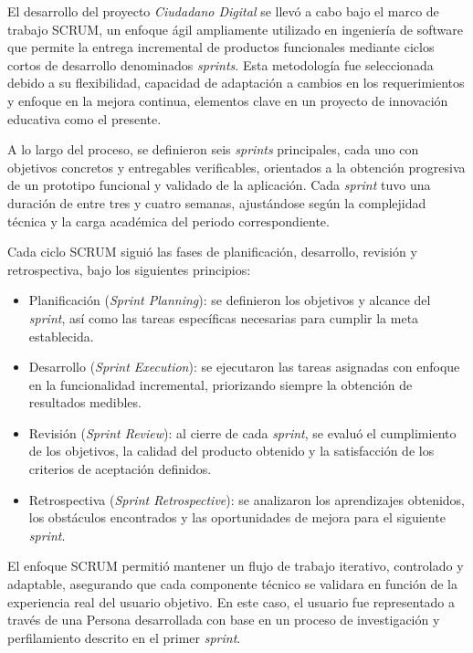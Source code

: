 El desarrollo del proyecto \textit{Ciudadano Digital} se llevó a cabo bajo el marco de
trabajo SCRUM, un enfoque ágil ampliamente utilizado en ingeniería de software
que permite la entrega incremental de productos funcionales mediante ciclos
cortos de desarrollo denominados \textit{sprints}. Esta metodología fue
seleccionada debido a su flexibilidad, capacidad de adaptación a cambios en los
requerimientos y enfoque en la mejora continua, elementos clave en un proyecto
de innovación educativa como el presente.

A lo largo del proceso, se definieron seis \textit{sprints} principales, cada
uno con objetivos concretos y entregables verificables, orientados a la
obtención progresiva de un prototipo funcional y validado de la aplicación.
Cada \textit{sprint} tuvo una duración de entre tres y cuatro semanas,
ajustándose según la complejidad técnica y la carga académica del periodo
correspondiente.

Cada ciclo SCRUM siguió las fases de planificación, desarrollo, revisión y
retrospectiva, bajo los siguientes principios:

\begin{itemize}
      \item Planificación (\textit{Sprint Planning}): se definieron los objetivos y alcance
            del \textit{sprint}, así como las tareas específicas necesarias para cumplir la
            meta establecida.
      \item Desarrollo (\textit{Sprint Execution}): se ejecutaron las tareas asignadas con
            enfoque en la funcionalidad incremental, priorizando siempre la obtención de
            resultados medibles.
      \item Revisión (\textit{Sprint Review}): al cierre de cada \textit{sprint}, se evaluó
            el cumplimiento de los objetivos, la calidad del producto obtenido y la
            satisfacción de los criterios de aceptación definidos.
      \item Retrospectiva (\textit{Sprint Retrospective}): se analizaron los aprendizajes
            obtenidos, los obstáculos encontrados y las oportunidades de mejora para el
            siguiente \textit{sprint}.
\end{itemize}

El enfoque SCRUM permitió mantener un flujo de trabajo iterativo, controlado y
adaptable, asegurando que cada componente técnico se validara en función de la
experiencia real del usuario objetivo. En este caso, el usuario fue
representado a través de una Persona desarrollada con base en un proceso de
investigación y perfilamiento descrito en el primer \textit{sprint}.

